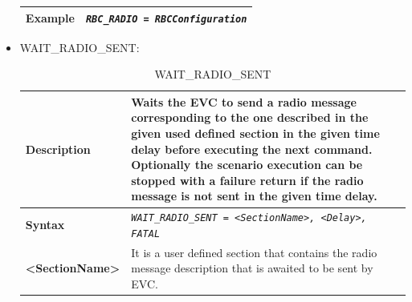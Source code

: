 \documentclass{template/openetcs}
\begin{document}
\begin{itemize}
\begin{longtable}{|l|l|l|}
					\begin{minipage}[t]{0.22\linewidth} \textbf{Example} \end{minipage}
				&	\multicolumn{2}{l|}{ \begin{minipage}[t]{0.78\linewidth} \emph{\texttt{RBC\_RADIO = RBCConfiguration}} \end{minipage} } \\
				
				\hline \hline
				
			\end{longtable}
			
		\item WAIT\_RADIO\_SENT:
										
			
			
			\begin{longtable}{|l|l|l|}
				\caption{WAIT\_RADIO\_SENT}\\
				\hline
				
					\begin{minipage}[t]{0.22\linewidth} \textbf{Description} \end{minipage} 
				&	\begin{minipage}[t]{0.78\linewidth} Waits the EVC to send a radio message corresponding to the one described in the given used defined section in the given time delay before executing the next command. Optionally the scenario execution can be stopped with a failure return if the radio message is not sent in the given time delay. \end{minipage} \\
				
				\hline
								
					\begin{minipage}[t]{0.22\linewidth} \textbf{Syntax}	\end{minipage}
				&	\multicolumn{2}{l|}{ \begin{minipage}[t]{0.78\linewidth} \emph{\texttt{WAIT\_RADIO\_SENT = <SectionName>, <Delay>, FATAL}} \end{minipage} } \\
				
				\hline
				
					\begin{minipage}[t]{0.22\linewidth} \textbf{<SectionName>} \end{minipage}
				&	\multicolumn{2}{l|}{ \begin{minipage}[t]{0.78\linewidth} It is a user defined section that contains the radio message description that is awaited to be sent by EVC. \end{minipage} } \\
				

\end{longtable}
\end{itemize}
\end{document}

